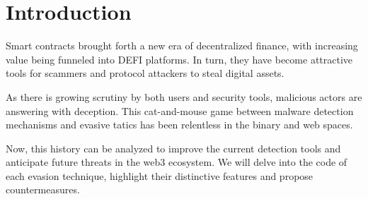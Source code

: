 \section{Introduction} \label{chap:introduction}

Smart contracts brought forth a new era of decentralized finance, with increasing value being funneled into DEFI platforms.
In turn, they have become attractive tools for scammers and protocol attackers to steal digital assets.

As there is growing scrutiny by both users and security tools, malicious actors are answering with deception.
This cat-and-mouse game between malware detection mechanisms and evasive tatics has been relentless in the binary and web spaces.

Now, this history can be analyzed to improve the current detection tools and anticipate future threats in the web3 ecosystem.
We will delve into the code of each evasion technique, highlight their distinctive features and propose countermeasures.
